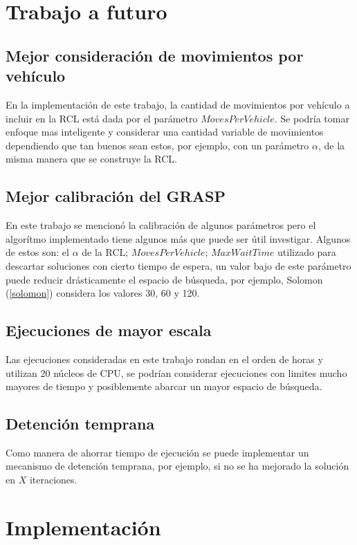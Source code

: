 \documentclass{article}
\begin{document}
  \section*{Trabajo a futuro}

  \subsection*{Mejor consideración de movimientos por vehículo}
  
  En la implementación de este trabajo, la cantidad de movimientos por vehículo a incluir en la RCL está dada por el parámetro $MovesPerVehicle$. Se podría tomar enfoque mas inteligente y considerar una cantidad variable de movimientos dependiendo que tan buenos sean estos, por ejemplo, con un parámetro $\alpha$, de la misma manera que se construye la RCL.

  \subsection*{Mejor calibración del GRASP}

  En este trabajo se mencionó la calibración de algunos parámetros pero el algorítmo implementado tiene algunos más que puede ser útil investigar. Algunos de estos son: el $\alpha$ de la RCL; $MovesPerVehicle$; $MaxWaitTime$ utilizado para descartar soluciones con cierto tiempo de espera, un valor bajo de este parámetro puede reducir drásticamente el espacio de búsqueda, por ejemplo, Solomon (\ref{solomon}) considera los valores 30, 60 y 120.

  \subsection*{Ejecuciones de mayor escala}

  Las ejecuciones consideradas en este trabajo rondan en el orden de horas y utilizan 20 núcleos de CPU, se podrían considerar ejecuciones con limites mucho mayores de tiempo y posiblemente abarcar un mayor espacio de búsqueda.

  \subsection*{Detención temprana}

  Como manera de ahorrar tiempo de ejecución se puede implementar un mecanismo de detención temprana, por ejemplo, si no se ha mejorado la solución en $X$ iteraciones.

  \section*{Implementación}
\end{document}
